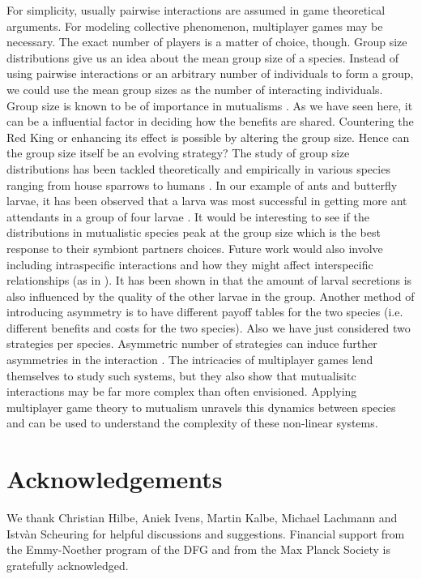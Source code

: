 \documentclass[a4paper]{scrartcl}
\begin{document}
For simplicity, usually pairwise interactions are assumed in game theoretical arguments.
For modeling collective phenomenon, multiplayer games may be necessary.
The exact number of players is a matter of choice, though.
Group size distributions give us an idea about the mean group size of a species.
Instead of using pairwise interactions or an arbitrary number of individuals to form a group, we could use the mean group sizes as the number of interacting individuals.
Group size is known to be of importance in mutualisms \citep{wilson:1983an}.
As we have seen here, it can be a influential factor in deciding how the benefits are shared.
Countering the Red King or enhancing its effect is possible by altering the group size.
Hence can the group size itself be an evolving strategy?
The study of group size distributions has been tackled theoretically \citep{krause:2002bo,hauert:2002te, niwa:2003gs,hauert:2006ha, hauert:2008bb,veelen:2010gc,sumpter:2010bo,braennstroem:2011mb,pena:2011aa} and empirically in various species ranging from house sparrows to humans \citep{zipf:1949sg,krause:2002bo,sumpter:2010bo,griesser:2011po}.
In our example of ants and butterfly larvae, it has been observed that a larva was most successful in getting more ant attendants in a group of four larvae \citep{pierce:1987aa}.
It would be interesting to see if the distributions in mutualistic species peak at the group size which is the best response to their symbiont partners choices.
Future work would also involve including intraspecific interactions and how they might affect interspecific relationships (as in \citet{bshary:2008aa}).
It has been shown in \cite{axen:1998aa} that the amount of larval secretions is also influenced by the quality of the other larvae in the group.
Another method of introducing asymmetry is to have different payoff tables for the two species (i.e. different benefits and costs for the two species).
Also we have just considered two strategies per species.
Asymmetric number of strategies can induce further asymmetries in the interaction \citep{schuster:1981aa}.
The intricacies of multiplayer games lend themselves to study such systems, but they also show that mutualisitc interactions may be far more complex than often envisioned.
Applying multiplayer game theory to mutualism unravels this dynamics between species and can be used to understand the complexity of these non-linear systems.


\section*{Acknowledgements} 
We thank Christian Hilbe, Aniek Ivens, Martin Kalbe, Michael Lachmann and Istv\`an Scheuring  for helpful discussions and suggestions. Financial support from the Emmy-Noether program of the DFG and from the Max Planck Society is gratefully acknowledged.
\end{document}
